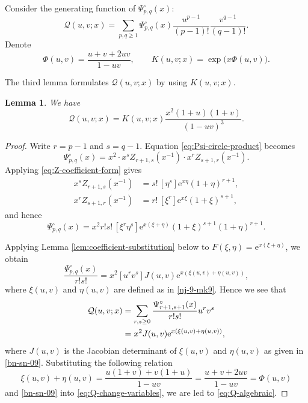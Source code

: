 \documentclass[12pt,a4paper,reqno]{amsart}
\numberwithin{equation}{section}
\newtheorem{lemma}[theorem]{Lemma}
\theoremstyle{definition}
\theoremstyle{remark}
\newcommand{\e}{\mathrm e}
\begin{document}
Consider the generating function of $\Psi^{\circ}_{p,q}(x)$:
\[
 \mathcal Q(u,v;x)=
 \sum_{p,q\geq1}\Psi^{\circ}_{p,q}(x)
 \frac{u^{p-1}}{(p-1)!}\frac{v^{q-1}}{(q-1)!}.
\]
Denote 
\begin{equation*} 
 \Phi(u,v)=\frac{u+v+2uv}{1-uv},
 \qquad K(u,v;x)=\exp\bigl(x\Phi(u,v)\bigr).
\end{equation*}




The third lemma formulates $\mathcal Q(u,v;x)$ by using $K(u,v;x)$. 


\begin{lemma}\label{lem:shifted-algebraic}
We have 
\begin{equation}\label{eq:Q-algebraic}
 \mathcal Q(u,v;x)
 =K(u,v;x)\frac{x^2(1+u)(1+v)}{(1-uv)^3}.
\end{equation}
\end{lemma}

\begin{proof}
Write $r=p-1$ and $s=q-1$.  Equation
\eqref{eq:Psi-circle-product} becomes
\[
 \Psi^{\circ}_{p,q}(x)
 =x^2\cdot x^sZ_{r+1,s}(x^{-1})\cdot 
       x^rZ_{s+1,r}(x^{-1}).
\]
Applying \eqref{eq:Z-coefficient-form} gives 
\begin{align*}
 x^sZ_{r+1,s}(x^{-1})
   &=s!\,[\eta^s]\e^{x\eta}(1+\eta)^{r+1},\\
 x^rZ_{s+1,r}(x^{-1})
   &=r!\,[\xi^r]\e^{x\xi}(1+\xi)^{s+1},
\end{align*}
and hence 
\begin{equation*}
 \Psi^{\circ}_{p,q}(x)
 =x^2r!s!\,[\xi^r\eta^s]
 \e^{x(\xi+\eta)}(1+\xi)^{s+1}(1+\eta)^{r+1}.
\end{equation*}

Applying Lemma \ref{lem:coefficient-substitution} below to
$F(\xi,\eta)=\e^{x(\xi+\eta)}$, we
obtain
\[
 \frac{\Psi^{\circ}_{p,q}(x)}{r!s!}
 =x^2[u^rv^s]J(u,v)
   \e^{x(\xi(u,v)+\eta(u,v))},
\]
where $\xi(u,v)$ and $\eta(u,v)$  are defined as in \eqref{nj-9-mk9}. 
Hence we see that 
\begin{align}
 \mathcal Q(u,v;x)
 &=\sum_{r,s\geq0}\frac{\Psi^{\circ}_{r+1,s+1}(x)}{r!s!}u^rv^s\notag\\
 &=x^2J(u,v)\e^{x(\xi(u,v)+\eta(u,v))},
 \label{eq:Q-change-variables}
\end{align}
where $J(u,v)$ is the Jacobian determinant  of $\xi(u,v)$ and $\eta(u,v)$ as given in  \eqref{bn-sn-09}. 
Substituting the following relation 
\[
 \xi(u,v)+\eta(u,v)
 =\frac{u(1+v)+v(1+u)}{1-uv}
 =\frac{u+v+2uv}{1-uv}=\Phi(u,v)
\]
 and  \eqref{bn-sn-09} 
into 
\eqref{eq:Q-change-variables}, we are led to  \eqref{eq:Q-algebraic}.
\end{proof}
\end{document}
